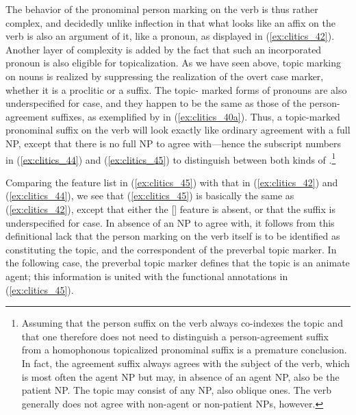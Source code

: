The behavior of the pronominal person marking on the verb is thus rather
complex, and decidedly unlike inflection in that what looks like an affix on
the verb is also an argument of it, like a pronoun, as displayed in
(\ref{ex:clitics_42}). Another layer of complexity is added by the fact that
such an incorporated pronoun is also eligible for topicalization. As we have
seen above, topic marking on nouns is realized by suppressing the realization
of the overt case marker, whether it is a proclitic or a suffix. The topic-
marked forms of pronouns are also underspecified for case, and they happen to
be the same as those of the person-agreement suffixes, as exemplified by
 in (\ref{ex:clitics_40a}). Thus, a topic-marked pronominal
suffix on the verb will look exactly like ordinary agreement with a full NP,
except that there is no full NP to agree with---hence the subscript numbers in
(\ref{ex:clitics_44}) and (\ref{ex:clitics_45}) to distinguish between both
kinds of .\footnote{Assuming that the person suffix on the verb
always co-indexes the topic and that one therefore does not need to distinguish
a person-agreement suffix from a homophonous topicalized pronominal suffix is a
premature conclusion. In fact, the agreement suffix always agrees with the
subject of the verb, which is most often the agent NP but may, in absence of an
agent NP, also be the patient NP. The topic may consist of any NP, also oblique
ones. The verb generally does not agree with non-agent or non-patient NPs, 
however.}

\begin{morphlex}
\ex\label{ex:clitics_45}
\xe
\end{morphlex}

Comparing the feature list in (\ref{ex:clitics_45}) with that in
(\ref{ex:clitics_42}) and (\ref{ex:clitics_44}), we see that
(\ref{ex:clitics_45}) is basically the same as (\ref{ex:clitics_42}), except
that either the [\Case{}] feature is absent, or that the suffix is
underspecified for case. In absence of an NP to agree with, it follows from
this definitional lack that the person marking on the verb itself is to be
identified as constituting the topic, and the correspondent of the preverbal
topic marker. In the following case, the preverbal topic marker defines that
the topic is an animate agent; this information is united with the functional
annotations in (\ref{ex:clitics_45}).

